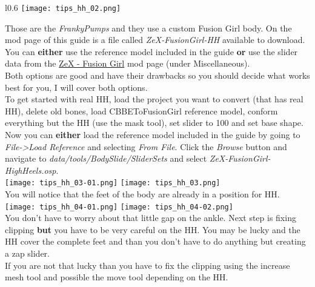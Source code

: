 \begin{wrapfigure}[13]{l}{0.6\textwidth}
    \vspace{-12pt}
    \texttt{[image: tips\_hh\_02.png]}
\end{wrapfigure}
Those are the \textit{FrankyPumps} and they use a custom Fusion Girl body. On the mod page of this guide is a file called 
\textit{ZeX-FusionGirl-HH} available to download. You can \textbf{either} use the reference model included in the guide \textbf{or} 
use the slider data from the \href{https://www.nexusmods.com/fallout4/mods/37268?tab=files}{ZeX - Fusion Girl} mod page (under Miscellaneous).\\
Both options are good and have their drawbacks so you should decide what works best for you, I will cover both options.\\
\linebreak
To get started with real HH, load the project you want to convert (that has real HH), delete old bones, load CBBEToFusionGirl reference 
model, conform everything but the HH (use the mask tool), set slider to 100 and set base shape.\\
Now you can \textbf{either} load the reference model included in the guide by going to \textit{File->Load Reference} and selecting 
\textit{From File}. Click the \textit{Browse} button and navigate to \textit{data/tools/BodySlide/SliderSets} and select \textit{ZeX-FusionGirl-HighHeels.osp}.\\
\texttt{[image: tips\_hh\_03-01.png]}
\texttt{[image: tips\_hh\_03.png]}\\
You will notice that the feet of the body are already in a position for HH.\\
\texttt{[image: tips\_hh\_04-01.png]}
\texttt{[image: tips\_hh\_04-02.png]}\\
You don't have to worry about that little gap on the ankle. Next step is fixing clipping \textbf{but} you have to be very careful 
on the HH. You may be lucky and the HH cover the complete feet and than you don't have to do anything but creating a zap slider.\\
If you are not that lucky than you have to fix the clipping using the increase mesh tool and possible the move tool depending on 
the HH.